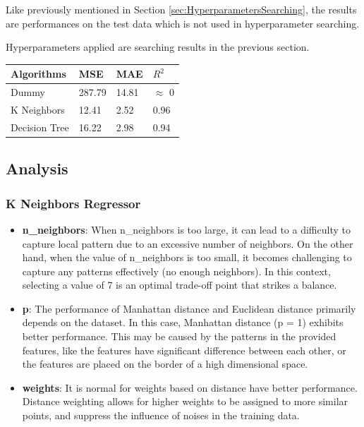 \documentclass[a4paper]{article}
\begin{document}
Like previously mentioned in Section \ref{sec:HyperparametersSearching}, the results are performances on the test data which is not used in hyperparameter searching.

Hyperparameters applied are searching results in the previous section.

\begin{table}[htbp]
    \centering
    \begin{tabular}{|l|l|l|l|}
    \hline
    \textbf{Algorithms} & \textbf{MSE} & \textbf{MAE} & \textbf{$R^2$} \\ \hline
    Dummy               & 287.79       & 14.81        & $\approx$ 0           \\ \hline
    K Neighbors         & 12.41        & 2.52         & 0.96        \\ \hline
    Decision Tree       & 16.22        & 2.98         & 0.94        \\ \hline
    \end{tabular}
\end{table}

\subsection{Analysis}

\subsubsection{K Neighbors Regressor}

\begin{itemize}
    \item \textbf{n\_neighbors}: When n\_neighbors is too large, it can lead to a difficulty to capture local pattern due to an excessive number of neighbors. On the other hand, when the value of n\_neighbors is too small, it becomes challenging to capture any patterns effectively (no enough neighbors). In this context, selecting a value of 7  is an optimal trade-off point that strikes a balance.
    \item \textbf{p}: The performance of Manhattan distance and Euclidean distance primarily depends on the dataset. In this case, Manhattan distance (p = 1) exhibits better performance. This may be caused by the patterns in the provided features, like the features have significant difference between each other, or the features are placed on the border of a high dimensional space.
    \item \textbf{weights}: It is normal for weights based on distance have better performance. Distance weighting allows for higher weights to be assigned to more similar points, and suppress the influence of noises in the training data.
\end{itemize}
\end{document}
